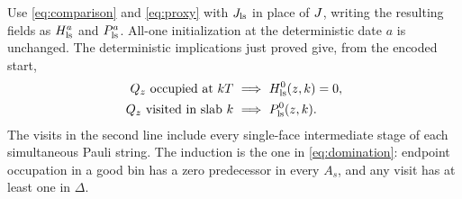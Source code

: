 Use \eqref{eq:comparison} and \eqref{eq:proxy} with
\(J_{\rm ls}\) in place of \(J\), writing the resulting
fields as \(H_{\rm ls}^a\) and \(P_{\rm ls}^a\).
All-one initialization at the deterministic date \(a\) is
unchanged. The deterministic implications just proved give,
from the encoded start,
\begin{equation}\label{eq:ls-domination}
 \begin{split}
 Q_z\text{ occupied at }kT&\ \Longrightarrow\
                               H_{\rm ls}^0(z,k)=0,\\
 Q_z\text{ visited in slab }k&\ \Longrightarrow\
                               P_{\rm ls}^0(z,k).
 \end{split}
\end{equation}
The visits in the second line include every single-face
intermediate stage of each simultaneous Pauli string.
The induction is the one in \eqref{eq:domination}: endpoint
occupation in a good bin has a zero predecessor in every
\(A_s\), and any visit has at least one in \(\Delta\).

